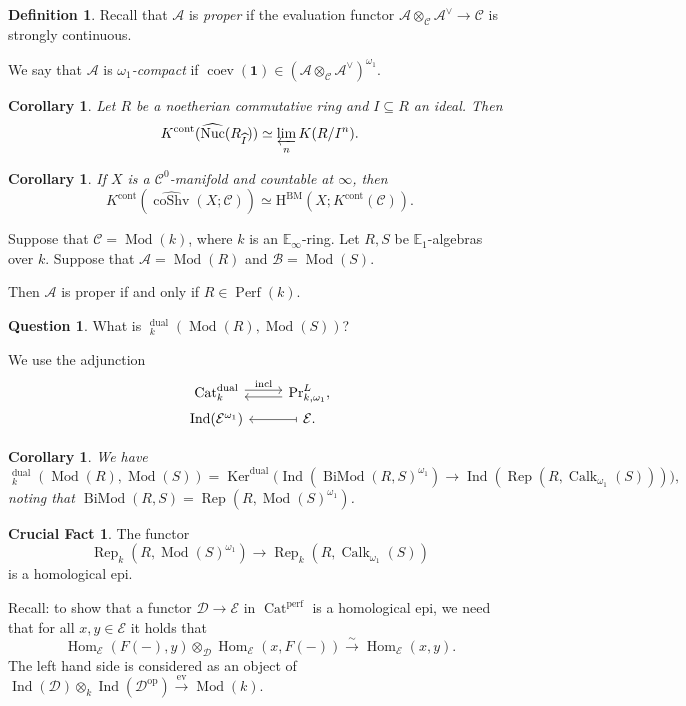 \documentclass[draft]{amsart}
\newcommand{\EE}{\mathbb{E}}
\renewcommand{\H}{\mathrm{H}}
\newcommand{\ul}[1]{\underline{#1}}
\newcommand{\wh}[1]{\widehat{#1}}
\newcommand{\cat}[1]{\mathcal{#1}}
\newcommand{\op}{\mathrm{op}}
\newcommand{\isoto}{\mathbin{\xrightarrow{\sim}}}
\renewcommand{\Pr}{\mathrm{Pr}}
\newcommand{\blank}{-} %
\newcommand{\one}{\mathbf{1}}
\DeclareMathOperator{\Hom}{Hom}
\DeclareMathOperator{\iHom}{\ul{Hom}}
\DeclareMathOperator{\coShv}{coShv}
\DeclareMathOperator{\Ind}{Ind}
\DeclareMathOperator{\Nuc}{Nuc}
\DeclareMathOperator{\Cat}{Cat}
\DeclareMathOperator{\Mod}{Mod}
\DeclareMathOperator{\Perf}{Perf}
\DeclareMathOperator{\Calk}{Calk}
\DeclareMathOperator{\BiMod}{BiMod}
\DeclareMathOperator{\Rep}{Rep}
\DeclareMathOperator{\Ker}{Ker}
\DeclareMathOperator{\coev}{coev}
\newtheorem{cor}[thm]{Corollary}
\theoremstyle{definition}
\newtheorem{defn}[thm]{Definition}
\newtheorem{question}[thm]{Question}
\newtheorem{crucialfact}[thm]{Crucial Fact}
\begin{document}
\begin{defn}
Recall that $\cat A$ is \emph{proper} if the evaluation functor $\cat A\otimes_{\cat C} \cat A^\vee \to \cat C$ is strongly continuous.

We say that $\cat A$ is \emph{$\omega_1$-compact} if $\coev(\one) \in (\cat A\otimes_{\cat C}\cat A^\vee)^{\omega_1}$.
\end{defn}

\begin{cor}
Let $R$ be a noetherian commutative ring and $I\subseteq R$ an ideal. Then
\[
K^{\mathrm{cont}}(\wh{\Nuc}(R_{\wh{I}}))\simeq \varprojlim_n K(R/I^{n}).
\]
\end{cor}

\begin{cor}
If $X$ is a ${\mathcal C}^0$-manifold and countable at $\infty$, then
\[
K^{\mathrm{cont}}(\wh{\coShv}(X;\cat C)) \simeq \H^{\mathrm{BM}}(X; K^{\mathrm{cont}}(\cat C)).
\]
\end{cor}

Suppose that $\cat C = \Mod(k)$, where $k$ is an $\EE_\infty$-ring. Let $R, S$ be $\EE_1$-algebras over $k$. Suppose that $\cat A = \Mod(R)$ and $\cat B = \Mod(S)$.

Then $\cat A$ is proper if and only if $R \in \Perf(k)$.

\begin{question}
What is $\iHom^{\mathrm{dual}}_k(\Mod(R), \Mod(S))$?
\end{question}

We use the adjunction
\[
\begin{tikzcd}[row sep=0em]
\Cat^{\mathrm{dual}}_k \ar[r,shift left,"\text{incl}"] & \ar[l,shift left] \Pr^L_{k,\omega_1}, \\
\Ind(\cat E^{\omega_1}) & \ar[l,mapsto] \cat E.
\end{tikzcd}
\]

\begin{cor}
We have 
\[
\iHom_k^{\mathrm{dual}}(\Mod(R), \Mod(S)) = \Ker^{\mathrm{dual}}\bigl( \Ind(\BiMod(R,S)^{\omega_1}) \to \Ind(\Rep(R, \Calk_{\omega_1}(S)))\bigr),
\]
noting that $\BiMod(R,S) = \Rep(R, \Mod(S)^{\omega_1})$.
\end{cor}

\begin{crucialfact}
The functor
\[
\Rep_k(R, \Mod(S)^{\omega_1}) \to \Rep_k(R, \Calk_{\omega_1}(S))
\]
is a homological epi.
\end{crucialfact}

Recall: to show that a functor $\cat D\to \cat E$ in $\Cat^{\mathrm{perf}}$ is a homological epi, we need that for all $x,y\in \cat E$ it holds that
\[
\Hom_{\cat E}(F(\blank), y) \otimes_{\cat D} \Hom_{\cat E}(x, F(\blank)) \isoto \Hom_{\cat E}(x,y).
\]
The left hand side is considered as an object of $\Ind(\cat D) \otimes_k \Ind(\cat D^\op) \xrightarrow{\mathrm{ev}} \Mod(k)$.
\end{document}
